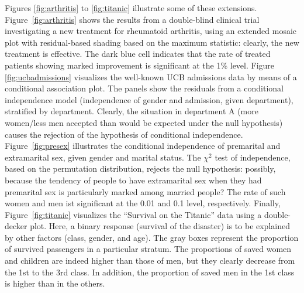 \documentclass{Z}
\begin{document}
Figures \ref{fig:arthritis} to \ref{fig:titanic} illustrate some of these
extensions. Figure~\ref{fig:arthritis} shows the results from a
double-blind clinical trial
investigating a new treatment for rheumatoid arthritis, using an
extended mosaic plot with residual-based shading based on the
maximum statistic: clearly, the new treatment is effective. The dark
blue cell indicates that the rate of treated patients showing marked improvement
is significant at the 1\% level. Figure
\ref{fig:ucbadmissions} visualizes the well-known UCB admissions data
by means of a conditional association plot. The panels show the
residuals from a conditional independence model (independence of gender
and admission, given department), stratified by department. Clearly,
the situation in department A (more women/less men accepted than
would be expected under the null hypothesis) causes the rejection of the
hypothesis of conditional independence. Figure~\ref{fig:presex}
illustrates the conditional independence of premarital and
extramarital sex, given gender and marital status. The $\chi^2$ test 
of independence, based on the permutation distribution,  
rejects the null hypothesis: possibly, because
the tendency of people to have extramarital
sex when they had premarital sex 
is particularly marked among married people? The rate of such women and men
ist significant at the 0.01 and 0.1 level, respectively.
Finally, Figure~\ref{fig:titanic} visualizes the ``Survival on the Titanic'' 
data using a double-decker plot. Here, a binary response (survival of the disaster)
is to be explained by other factors (class, gender, and age). The gray
boxes represent the proportion of survived passengers in a particular
stratum. The proportions of saved women and children are indeed higher
than those of men, but they clearly decrease from the 1st to the 3rd class. In
addition, the proportion of saved men in the 1st class is higher than
in the others.
\end{document}
